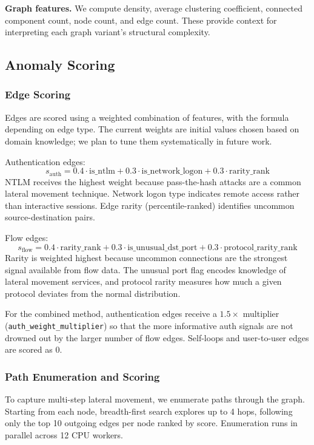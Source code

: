 \textbf{Graph features.}
We compute density, average clustering coefficient, connected component count, node count, and edge count. These provide context for interpreting each graph variant's structural complexity.

\subsection{Anomaly Scoring}

\subsubsection{Edge Scoring}
Edges are scored using a weighted combination of features, with the formula depending on edge type. The current weights are initial values chosen based on domain knowledge; we plan to tune them systematically in future work.

Authentication edges:
\begin{equation}
s_{\text{auth}} = 0.4 \cdot \text{is\_ntlm} + 0.3 \cdot \text{is\_network\_logon} + 0.3 \cdot \text{rarity\_rank}
\end{equation}
NTLM receives the highest weight because pass-the-hash attacks are a common lateral movement technique. Network logon type indicates remote access rather than interactive sessions. Edge rarity (percentile-ranked) identifies uncommon source-destination pairs.

Flow edges:
\begin{equation}
s_{\text{flow}} = 0.4 \cdot \text{rarity\_rank} + 0.3 \cdot \text{is\_unusual\_dst\_port} + 0.3 \cdot \text{protocol\_rarity\_rank}
\end{equation}
Rarity is weighted highest because uncommon connections are the strongest signal available from flow data. The unusual port flag encodes knowledge of lateral movement services, and protocol rarity measures how much a given protocol deviates from the normal distribution.

For the combined method, authentication edges receive a $1.5\times$ multiplier (\texttt{auth\_weight\_multiplier}) so that the more informative auth signals are not drowned out by the larger number of flow edges. Self-loops and user-to-user edges are scored as 0.

\subsubsection{Path Enumeration and Scoring}
To capture multi-step lateral movement, we enumerate paths through the graph. Starting from each node, breadth-first search explores up to 4 hops, following only the top 10 outgoing edges per node ranked by score. Enumeration runs in parallel across 12 CPU workers.

